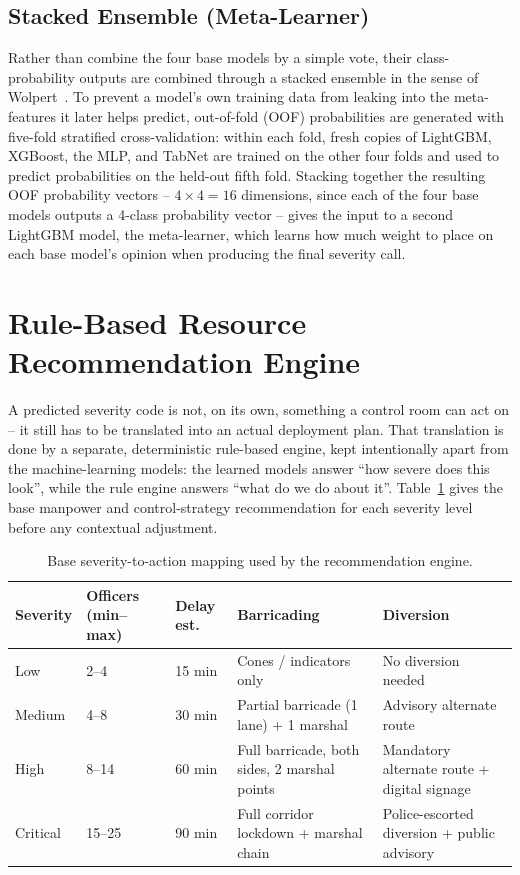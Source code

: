 \subsection{Stacked Ensemble (Meta-Learner)}

Rather than combine the four base models by a simple vote, their class-probability outputs are combined through a stacked ensemble in the sense of Wolpert~\cite{wolpert1992stacked}. To prevent a model's own training data from leaking into the meta-features it later helps predict, out-of-fold (OOF) probabilities are generated with five-fold stratified cross-validation: within each fold, fresh copies of LightGBM, XGBoost, the MLP, and TabNet are trained on the other four folds and used to predict probabilities on the held-out fifth fold. Stacking together the resulting OOF probability vectors -- $4 \times 4 = 16$ dimensions, since each of the four base models outputs a 4-class probability vector -- gives the input to a second LightGBM model, the meta-learner, which learns how much weight to place on each base model's opinion when producing the final severity call.

\section{Rule-Based Resource Recommendation Engine}
\label{sec:recommendation-engine}

A predicted severity code is not, on its own, something a control room can act on -- it still has to be translated into an actual deployment plan. That translation is done by a separate, deterministic rule-based engine, kept intentionally apart from the machine-learning models: the learned models answer ``how severe does this look'', while the rule engine answers ``what do we do about it''. Table~\ref{tab:base-recommendation} gives the base manpower and control-strategy recommendation for each severity level before any contextual adjustment.

\begin{table}[!h]
\centering
\caption{Base severity-to-action mapping used by the recommendation engine.}
\label{tab:base-recommendation}
\small
\begin{tabular}{lp{1.7cm}p{1.4cm}p{4cm}p{4cm}}
\toprule
Severity & Officers (min--max) & Delay est. & Barricading & Diversion \\
\midrule
Low      & 2--4   & 15 min & Cones / indicators only & No diversion needed \\
Medium   & 4--8   & 30 min & Partial barricade (1 lane) + 1 marshal & Advisory alternate route \\
High     & 8--14  & 60 min & Full barricade, both sides, 2 marshal points & Mandatory alternate route + digital signage \\
Critical & 15--25 & 90 min & Full corridor lockdown + marshal chain & Police-escorted diversion + public advisory \\
\bottomrule
\end{tabular}
\end{table}

